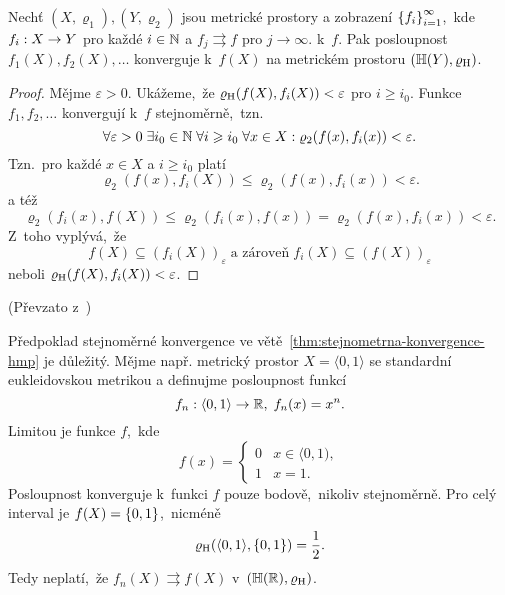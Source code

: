 \begin{theorem}\label{thm:stejnometrna-konvergence-hmp}
    Nechť $(X,\varrho_1),(Y,\varrho_2)$ jsou metrické prostory a zobrazení $\left\{f_i\right\}_{i=1}^\infty$,~kde $f_i:X \rightarrow Y$ pro každé $i\in\mathbb{N}$ a $f_j\rightrightarrows f$ pro $j\to\infty$. k~$f$. Pak posloupnost $f_1(X),f_2(X),\ldots$ konverguje k~$f(X)$ na metrickém prostoru $(\mathbb{H}(Y),\varrho_\textup{H})$.
\end{theorem}
\begin{proof}
    Mějme $\varepsilon>0$. Ukážeme,~že $\varrho_\textup{H}(f(X),f_i(X))<\varepsilon$ pro $i\geqslant i_0$. Funkce $f_1,f_2,\ldots$ konvergují k~$f$ stejnoměrně,~tzn.
    \[\forall\varepsilon>0\;\exists i_0\in\mathbb{N}\;\forall i\geqslant i_0\;\forall x\in X:\varrho_2(f(x),f_i(x))<\varepsilon.\]
    Tzn.~pro každé $x\in X$ a $i\geqslant i_0$ platí
    \[\varrho_2(f(x),f_i(X))\leqslant\varrho_2(f(x),f_i(x))<\varepsilon.\]
    a též
    \[\varrho_2(f_i(x),f(X))\leqslant\varrho_2(f_i(x),f(x))=\varrho_2(f(x),f_i(x))<\varepsilon.\]
    Z~toho vyplývá,~že
    \[f(X)\subseteq (f_i(X))_\varepsilon\;\text{a zároveň}\;f_i(X)\subseteq (f(X))_\varepsilon\]
    neboli $\varrho_\textup{H}(f(X),f_i(X))<\varepsilon$.
\end{proof}
(Převzato z~\citep[str. 74]{Edgar2008})
\begin{remark}
    Předpoklad stejnoměrné konvergence ve větě~\ref{thm:stejnometrna-konvergence-hmp} je důležitý. Mějme např. metrický prostor $X=\langle0,1\rangle$ se standardní eukleidovskou metrikou a definujme posloupnost funkcí
    \[f_n:\langle0,1\rangle \rightarrow \mathbb{R},\;f_n(x)=x^n.\]
    Limitou je funkce $f$,~kde
    \[f(x) = \begin{cases}
        0 & x \in \langle0,1),\\
        1 & x = 1.
        \end{cases}\]
    Posloupnost konverguje k~funkci $f$ pouze bodově,~nikoliv stejnoměrně. Pro celý interval je $f(X)=\left\{0,1\right\}$,~nicméně
    \[\varrho_\textup{H}(\langle0,1\rangle,\left\{0,1\right\})=\dfrac{1}{2}.\]
    Tedy neplatí,~že $f_n(X)\rightrightarrows f(X)$ v~$(\mathbb{H}(\mathbb{R}),\varrho_\textup{H})$.
\end{remark}